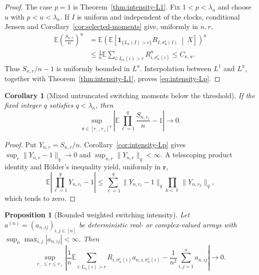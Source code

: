 \documentclass[11pt]{article}
\newcommand{\E}{\mathbb E}
\newcommand{\1}{\mathbf 1}
\newtheorem{proposition}[theorem]{Proposition}
\newtheorem{corollary}[theorem]{Corollary}
\theoremstyle{definition}
\theoremstyle{remark}
\begin{document}
\begin{proof}
The case $p=1$ is Theorem~\ref{thm:intensity-L1}.  Fix
$1<p<\lambda_\kappa$ and choose $u$ with
$p<u<\lambda_\kappa$.  If $I$ is uniform and independent of the clocks,
conditional Jensen and Corollary~\ref{cor:selected-moments} give,
uniformly in $n,r$,
\begin{align*}
 \E\left(\frac{S_{n,r}}n\right)^u
 &=\E\left(
   \E\left[
    \1_{\{L_n(I)>r\}}R_{I,\sigma_n^r(I)}
    \ \middle|\ X
   \right]
  \right)^u\\
 &\leq
 \frac1n\E\sum_{i:L_n(i)>r}R_{i,\sigma_n^r(i)}^u
 \leq C_{\kappa,u}.
\end{align*}
Thus $S_{n,r}/n-1$ is uniformly bounded in $L^u$.  Interpolation between
$L^1$ and $L^u$, together with Theorem~\ref{thm:intensity-L1}, proves
\eqref{eq:intensity-Lp}.
\end{proof}

\begin{corollary}[Mixed untruncated switching moments below the threshold]
\label{cor:mixed-untruncated-moments}
If the fixed integer $q$ satisfies $q<\lambda_\kappa$, then
\begin{equation}\label{eq:mixed-untruncated-moments}
 \sup_{\mathbf r\in[r_-,r_+]^q}
 \left|
  \E\prod_{\ell=1}^q\frac{S_{n,r_\ell}}n-1
 \right|
 \longrightarrow0.
\end{equation}
\end{corollary}

\begin{proof}
Put $Y_{n,r}=S_{n,r}/n$.  Corollary~\ref{cor:intensity-Lp} gives
$\sup_r\|Y_{n,r}-1\|_q\to0$ and
$\sup_{n,r}\|Y_{n,r}\|_q<\infty$.  A telescoping product identity and
H\"older's inequality yield, uniformly in $\mathbf r$,
\[
 \E\left|\prod_{\ell=1}^qY_{n,r_\ell}-1\right|
 \leq\sum_{\ell=1}^q
 \|Y_{n,r_\ell}-1\|_q
 \prod_{k<\ell}\|Y_{n,r_k}\|_q,
\]
which tends to zero.
\end{proof}

\begin{proposition}[Bounded weighted switching intensity]
\label{prop:weighted-switching}
Let $a^{(n)}=(a_{n,ij})_{i,j\in[n]}$ be deterministic real- or
complex-valued arrays with
$\sup_n\max_{i,j}|a_{n,ij}|<\infty$.  Then
\begin{equation}\label{eq:weighted-switching}
 \sup_{r_-\leq r\leq r_+}
 \left|
  \frac1n\E\sum_{i:L_n(i)>r}
   R_{i,\sigma_n^r(i)}a_{n,i,\sigma_n^r(i)}
  -\frac1{n^2}\sum_{i,j=1}^na_{n,ij}
 \right|
 \longrightarrow0.
\end{equation}
\end{proposition}
\end{document}
